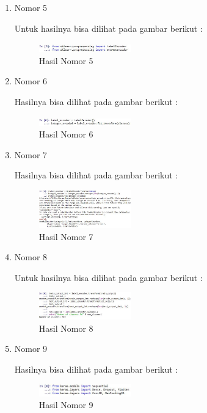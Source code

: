 \begin{enumerate}
\item Nomor 5
\hfill\break
	
Untuk hasilnya bisa dilihat pada gambar berikut :
\hfill\break
	\begin{figure}[H]
		\includegraphics[width=4cm]{figures/1174054/7/15.JPG}
		\centering
		\caption{Hasil Nomor 5}
	\end{figure}
	
\item Nomor 6\\
\hfill\break
	
Hasilnya bisa dilihat pada gambar berikut :
\hfill\break
	\begin{figure}[H]
		\includegraphics[width=4cm]{figures/1174054/7/16.JPG}
		\centering
		\caption{Hasil Nomor 6}
	\end{figure}
	
\item Nomor 7
\hfill\break
	
Hasilnya bisa dilihat pada gambar berikut :
\hfill\break
	\begin{figure}[H]
		\includegraphics[width=4cm]{figures/1174054/7/17.JPG}
		\centering
		\caption{Hasil Nomor 7}
	\end{figure}
	
\item Nomor 8
\hfill\break
	
Untuk hasilnya bisa dilihat pada gambar berikut :
\hfill\break
	\begin{figure}[H]
		\includegraphics[width=4cm]{figures/1174054/7/18.JPG}
		\centering
		\caption{Hasil Nomor 8}
	\end{figure}
	
\item Nomor 9
\hfill\break
	
Hasilnya bisa dilihat pada gambar berikut :
\hfill\break
	\begin{figure}[H]
		\includegraphics[width=4cm]{figures/1174054/7/19.JPG}
		\centering
		\caption{Hasil Nomor 9}
	\end{figure}
	

\end{enumerate}
